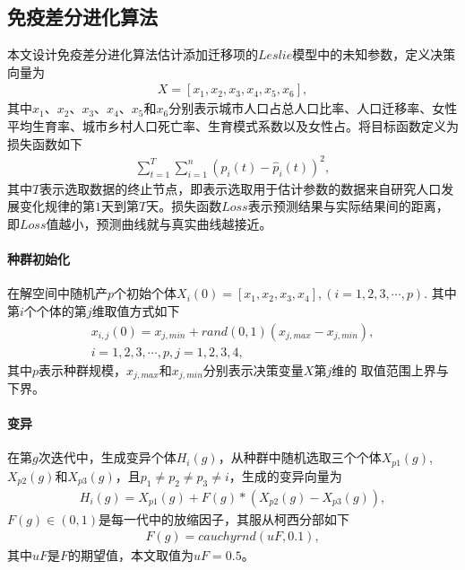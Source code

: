 \documentclass{whutmod}
\begin{document}
		\subsection{免疫差分进化算法}
		本文设计免疫差分进化算法估计添加迁移项的$Leslie$模型中的未知参数，定义决策向量为
		\begin{gather}
		X=[x_1,x_2,x_3,x_4,x_5,x_6],
		\end{gather}
		其中$x_1$、$x_2$、$x_3$、$x_4$、$x_5$和$x_6$分别表示城市人口占总人口比率、人口迁移率、女性平均生育率、城市乡村人口死亡率、生育模式系数以及女性占。将目标函数定义为损失函数如下
		\begin{gather}
		\sum_{t=1}^{T}\sum_{i=1}^{n}(p_i(t)-\hat{p}_i(t))^2,
		\end{gather}
		其中$T$表示选取数据的终止节点，即表示选取用于估计参数的数据来自研究人口发展变化规律的第$1$天到第$T$天。损失函数$Loss$表示预测结果与实际结果间的距离，即$Loss$值越小，预测曲线就与真实曲线越接近。
		\paragraph{种群初始化}
		在解空间中随机产$p$个初始个体$
		X_i(0)=[x_1,x_2,x_3,x_4],(i=1,2,3,\cdots,p).
		$
		其中第$i$个个体的第$j$维取值方式如下
		\begin{gather*}
		x_{i,j}(0)=x_{j,min}+rand(0,1)(x_{j,max}-x_{j,min}),\\i=1,2,3,\cdots,p,j=1,2,3,4,
		\end{gather*}
		其中$p$表示种群规模，$x_{j,max}$和$x_{j,min}$分别表示决策变量$X$第$j$维的
		取值范围上界与下界。
		\paragraph{变异}
		在第$g$次迭代中，生成变异个体$H_i(g)$，从种群中随机选取三个个体$X_{p1}(g)$,$X_{p2}(g)$和$X_{p3}(g)$，且$p_1\neq p_2\neq p_3\neq i$，生成的变异向量为
		\begin{gather*}
		H_i(g)=X_{p1}(g)+F(g)*(X_{p2}(g)-X_{p3}(g)),
		\end{gather*}
		$F(g)\in (0,1)$是每一代中的放缩因子，其服从柯西分部如下
		\begin{gather*}
		F(g)=cauchyrnd(uF,0.1),
		\end{gather*}
		其中$uF$是$F$的期望值，本文取值为$uF=0.5$。
\end{document}
